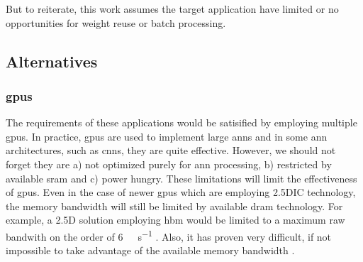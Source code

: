 But to reiterate, this work assumes the target application have limited or no opportunities for weight reuse or batch processing.

\iffalse
So the question becomes, can a system employ \ac{dram} with minimal \ac{sram} and still meet the system requirements?
\fi

\iffalse
We believe a system can be designed with \ac{dram} as the primary processing store. This will require careful use of data structures to describe storage within \ac{dram} to ensure we make good use of the potential bandwidth. But there are other benefits we will take advantage of, but more about that later.
\fi

\iffalse
There important application is disparate \ac{ann}s because specifically a form of \ac{dnn}, Convolutional Neural networks (\ac{cnn}) have gotten good press recently, but they are not the only \ac{dnn}.
\fi



\iffalse
So considering the performance improvements observed in other applications, it is expected that many customer facing or embedded applications will implement multiple instances of artificial neural networks to perform various functions.
have very large memory and processing requirements.
require multiple instances of \ac{ann}s of similar size to the \ac{ann} described in \cite{krizhevsky2012imagenet}.

For example employing multiple cameras or monitoring and controlling different systems in a drone, a automobile each with an image recognition \ac{ann}\cite{krizhevsky2012imagenet}\cite{bojarski2016end} for navigation, engine monitoring along with other system control.
\fi

\subsection{Alternatives}
\label{sec:Alternatives}

\subsubsection{\Acfp{gpu}}
\label{sec:gpu}
The requirements of these applications would be satisified by employing multiple \acp{gpu}.
In practice, \acp{gpu} are used to implement large \ac{ann}s and in some \ac{ann} architectures, such as \acp{cnn}, they are quite effective. However, we should not forget they are a) not optimized purely for \ac{ann} processing, b) restricted by available \ac{sram} and c) power hungry. 
These limitations will limit the effectiveness of \acp{gpu}.
Even in the case of newer \acp{gpu} which are employing 2.5DIC technology, the memory bandwidth will still be limited by available \ac{dram} technology.
For example, a 2.5D solution employing \ac{hbm} would be limited to a maximum raw bandwith on the order of \SI[per-mode=symbol]{6}{\tera \bit \per \second} \cite{Nvidia_p100_summary_datasheet}.
Also, it has proven very difficult, if not impossible to take advantage of the available memory bandwidth \cite{farabet2011neuflow} \cite{tensorflow2015-whitepaper}.

